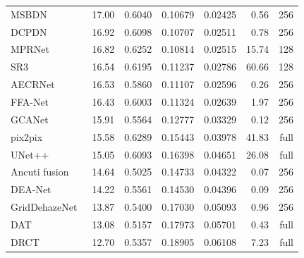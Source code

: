 \begin{table}[htbp]
{\begin{tabular}{lrrrrrr}
MSBDN~\cite{dong2020msbdn} & 17.00 & 0.6040 & 0.10679 & 0.02425 & 0.56 & 256 \\
DCPDN~\cite{zhang2018dcpdn} & 16.92 & 0.6098 & 0.10707 & 0.02511 & 0.78 & 256 \\
MPRNet~\cite{zamir2021mprnet} & 16.82 & 0.6252 & 0.10814 & 0.02515 & 15.74 & 128 \\
SR3~\cite{saharia2023sr3} & 16.54 & 0.6195 & 0.11237 & 0.02786 & 60.66 & 128 \\
AECRNet~\cite{wu2021aecrnet} & 16.53 & 0.5860 & 0.11107 & 0.02596 & 0.26 & 256 \\
FFA-Net~\cite{qin2020ffa} & 16.43 & 0.6003 & 0.11324 & 0.02639 & 1.97 & 256 \\
GCANet~\cite{chen2019gcanet} & 15.91 & 0.5564 & 0.12777 & 0.03329 & 0.12 & 256 \\
pix2pix~\cite{isola2017pix2pix} & 15.58 & 0.6289 & 0.15443 & 0.03978 & 41.83 & full \\
UNet++~\cite{zhou2018unetpp} & 15.05 & 0.6093 & 0.16398 & 0.04651 & 26.08 & full \\
Ancuti fusion~\cite{ancuti2013multiscale} & 14.64 & 0.5025 & 0.14733 & 0.04322 & 0.07 & 256 \\
DEA-Net~\cite{chen2024deanet} & 14.22 & 0.5561 & 0.14530 & 0.04396 & 0.09 & 256 \\
GridDehazeNet~\cite{liu2019griddehazenet} & 13.87 & 0.5400 & 0.17030 & 0.05093 & 0.96 & 256 \\
DAT~\cite{chen2023dat} & 13.08 & 0.5157 & 0.17973 & 0.05701 & 0.43 & full \\
DRCT~\cite{hsu2024drct} & 12.70 & 0.5357 & 0.18905 & 0.06108 & 7.23 & full \\
\bottomrule
\end{tabular}
}
\end{table}
